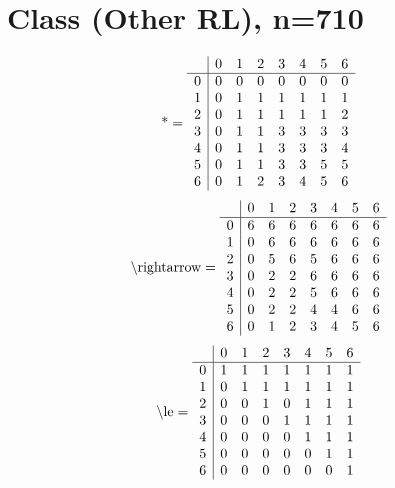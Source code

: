 \documentclass[11pt]{article}
\begin{document}
\section{Class (Other RL), n=710}
\[\text{*} = 
\begin{array}{r | r r r r r r r}
 & 0 & 1 & 2 & 3 & 4 & 5 & 6 \\ \hline
0 & 0 & 0 & 0 & 0 & 0 & 0 & 0 \\
1 & 0 & 1 & 1 & 1 & 1 & 1 & 1 \\
2 & 0 & 1 & 1 & 1 & 1 & 1 & 2 \\
3 & 0 & 1 & 1 & 3 & 3 & 3 & 3 \\
4 & 0 & 1 & 1 & 3 & 3 & 3 & 4 \\
5 & 0 & 1 & 1 & 3 & 3 & 5 & 5 \\
6 & 0 & 1 & 2 & 3 & 4 & 5 & 6 \\
\end{array}
\]
\[\text{\textbackslash rightarrow} = 
\begin{array}{r | r r r r r r r}
 & 0 & 1 & 2 & 3 & 4 & 5 & 6 \\ \hline
0 & 6 & 6 & 6 & 6 & 6 & 6 & 6 \\
1 & 0 & 6 & 6 & 6 & 6 & 6 & 6 \\
2 & 0 & 5 & 6 & 5 & 6 & 6 & 6 \\
3 & 0 & 2 & 2 & 6 & 6 & 6 & 6 \\
4 & 0 & 2 & 2 & 5 & 6 & 6 & 6 \\
5 & 0 & 2 & 2 & 4 & 4 & 6 & 6 \\
6 & 0 & 1 & 2 & 3 & 4 & 5 & 6 \\
\end{array}
\]
\[\text{\textbackslash le} = 
\begin{array}{r | r r r r r r r}
 & 0 & 1 & 2 & 3 & 4 & 5 & 6 \\ \hline
0 & 1 & 1 & 1 & 1 & 1 & 1 & 1 \\
1 & 0 & 1 & 1 & 1 & 1 & 1 & 1 \\
2 & 0 & 0 & 1 & 0 & 1 & 1 & 1 \\
3 & 0 & 0 & 0 & 1 & 1 & 1 & 1 \\
4 & 0 & 0 & 0 & 0 & 1 & 1 & 1 \\
5 & 0 & 0 & 0 & 0 & 0 & 1 & 1 \\
6 & 0 & 0 & 0 & 0 & 0 & 0 & 1 \\
\end{array}
\]
\end{document}
